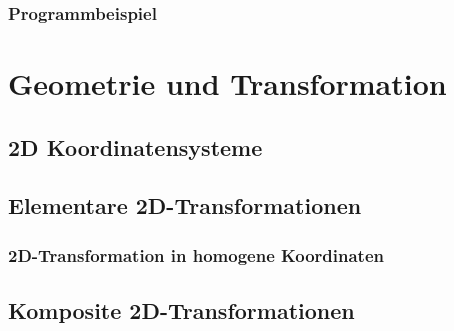 \documentclass{scrreprt}
\begin{document}
\subsection{Programmbeispiel}


\chapter{Geometrie und Transformation}

\section{2D Koordinatensysteme}
\section{Elementare 2D-Transformationen}
\subsection{2D-Transformation in homogene Koordinaten}

\section{Komposite 2D-Transformationen}
\end{document}
